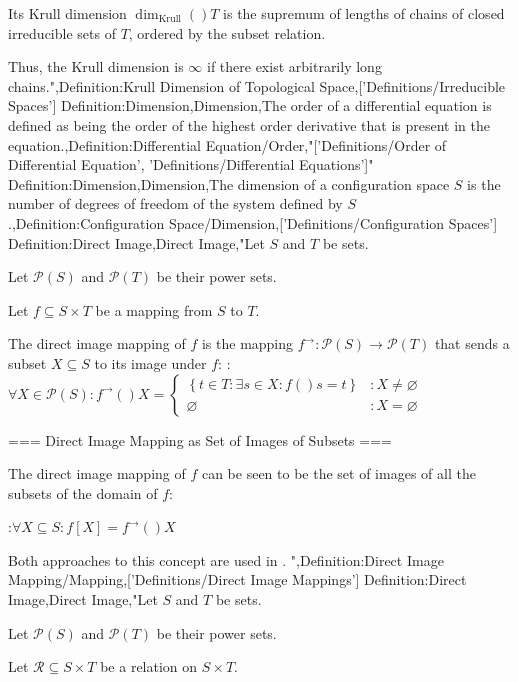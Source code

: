 Its Krull dimension $\dim_{\mathrm {Krull} }  \left(   \right)T$ is the supremum of lengths of chains of closed irreducible sets of $T$, ordered by the subset relation.

Thus, the Krull dimension is $\infty$ if there exist arbitrarily long chains.",Definition:Krull Dimension of Topological Space,['Definitions/Irreducible Spaces']
Definition:Dimension,Dimension,The order of a differential equation is defined as being the order of the highest order derivative that is present in the equation.,Definition:Differential Equation/Order,"['Definitions/Order of Differential Equation', 'Definitions/Differential Equations']"
Definition:Dimension,Dimension,The dimension of a configuration space $S$ is the number of degrees of freedom of the system defined by $S$.,Definition:Configuration Space/Dimension,['Definitions/Configuration Spaces']
Definition:Direct Image,Direct Image,"Let $S$ and $T$ be sets.

Let $\mathcal P \left( S \right)$ and $\mathcal P \left( T \right)$ be their power sets.

Let $f \subseteq S \times T$ be a mapping from $S$ to $T$.


The direct image mapping of $f$ is the mapping $f^\to: \mathcal P \left( S \right) \to \mathcal P \left( T \right)$ that sends a subset $X \subseteq S$ to its image under $f$:
:$\forall X \in \mathcal P \left( S \right): f^\to \left(   \right)X = \begin {cases} \left\lbrace t \in T: \exists s \in X: f \left(   \right)s = t \right\rbrace & : X \ne \varnothing \\ \varnothing & : X = \varnothing \end {cases}$


=== Direct Image Mapping as Set of Images of Subsets ===



The direct image mapping of $f$ can be seen to be the set of images of all the subsets of the domain of $f$:

:$\forall X \subseteq S: f \left[ X \right] = f^\to \left(   \right)X$


Both approaches to this concept are used in .
",Definition:Direct Image Mapping/Mapping,['Definitions/Direct Image Mappings']
Definition:Direct Image,Direct Image,"Let $S$ and $T$ be sets.

Let $\mathcal P \left( S \right)$ and $\mathcal P \left( T \right)$ be their power sets.

Let $\mathcal R \subseteq S \times T$ be a relation on $S \times T$.


